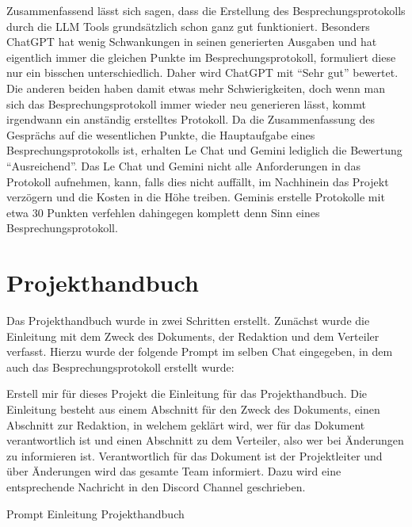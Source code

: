 Zusammenfassend lässt sich sagen, dass die Erstellung des Besprechungsprotokolls durch die LLM Tools grundsätzlich schon ganz gut 
funktioniert. Besonders ChatGPT hat wenig Schwankungen in seinen generierten Ausgaben und hat eigentlich immer die gleichen 
Punkte im Besprechungsprotokoll, formuliert diese nur ein bisschen unterschiedlich. Daher wird ChatGPT mit ``Sehr gut'' bewertet.
Die anderen beiden haben damit etwas mehr Schwierigkeiten, doch wenn man sich das Besprechungsprotokoll immer wieder neu generieren 
lässt, kommt irgendwann ein anständig erstelltes Protokoll. Da die Zusammenfassung des Gesprächs auf die wesentlichen Punkte, die 
Hauptaufgabe eines Besprechungsprotokolls ist, erhalten Le Chat und Gemini lediglich die Bewertung ``Ausreichend''. Das Le Chat und 
Gemini nicht alle Anforderungen in das Protokoll aufnehmen, kann, falls dies nicht auffällt, im Nachhinein das Projekt verzögern 
und die Kosten in die Höhe treiben. Geminis erstelle Protokolle mit etwa 30 Punkten verfehlen dahingegen komplett denn Sinn eines
Besprechungsprotokoll.

\section{Projekthandbuch}  \label{CompProjekthandbuch}

Das Projekthandbuch wurde in zwei Schritten erstellt. Zunächst wurde die Einleitung mit dem Zweck des Dokuments, der Redaktion 
und dem Verteiler verfasst. Hierzu wurde der folgende Prompt im selben Chat eingegeben, in dem auch das Besprechungsprotokoll 
erstellt wurde:

\begin{prompt}[H]
    \begin{tcolorbox}[colback=gray!20, colframe=gray!20, boxrule=0pt, sharp corners] 
        Erstell mir für dieses Projekt die Einleitung für das Projekthandbuch. Die Einleitung besteht aus einem Abschnitt für 
        den Zweck des Dokuments, einen Abschnitt zur Redaktion, in welchem geklärt wird, wer für das Dokument verantwortlich ist 
        und einen Abschnitt zu dem Verteiler, also wer bei Änderungen zu informieren ist. Verantwortlich für das Dokument ist der 
        Projektleiter und über Änderungen wird das gesamte Team informiert. Dazu wird eine entsprechende Nachricht in den Discord 
        Channel geschrieben.
        \vfill
    \end{tcolorbox}
    \caption{Prompt Einleitung Projekthandbuch}
    \label{Prompt Einleitung Projekthandbuch}
\end{prompt}

